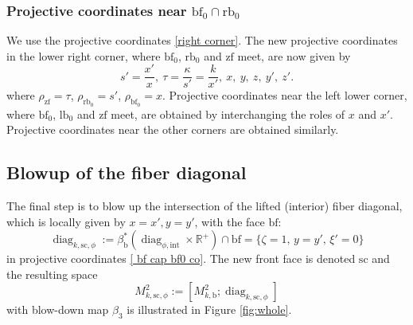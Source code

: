 \documentclass[11pt]{article}
\numberwithin{equation}{section}
\newcommand{\intt}{\mathrm{int}}
\theoremstyle{plain}
\theoremstyle{definition}
\newcommand{\R}{{\mathbb{R}}}
\newcommand{\bb}{{\mathrm{b}}}
\newcommand{\lfz}{{\mathrm{lb}_0}}
\newcommand{\rfz}{{\mathrm{rb}_0}}
\newcommand{\bbf}{{\mathrm{bf}}}
\newcommand{\bfz}{{\bbf_0}}
\newcommand{\ssc}{{\mathrm{sc}}}
\newcommand{\zf}{{\mathrm{zf}}}
\DeclareMathOperator\diag{diag}
\begin{document}
\subsubsection*{Projective coordinates near $\bfz \cap \rfz$}
We use the projective coordinates \eqref{right corner}. The new projective
coordinates in the lower right corner, where $\bfz$, $\rfz$ and $\zf$ meet, are now given by
\begin{equation}
s' = \frac{x'}{x}, \ \tau = \frac{\kappa}{s'} = \frac{k}{x'}, \ x, \ y, \ z, \ y', \ z'.
\end{equation}
where $\rho_{\zf} = \tau$, $\rho_{\rfz} = s'$, $\rho_{\bfz} = x$. Projective
coordinates near the left lower corner, where $\bfz$, $\lfz$ and $\zf$ meet,
are obtained by interchanging the roles of $x$ and $x'$. Projective coordinates near the other
corners are obtained similarly.

\subsection{Blowup of the fiber diagonal} \label{subsec:bup fiber diag}
The final step is to blow up the intersection of the lifted (interior) fiber diagonal, which is locally given by $x=x',y=y'$, with the face $\bbf$:
\begin{equation}
\label{eqn:def diag k sc phi}
\diag_{k,\ssc,\phi} := \beta_\bb^*(\diag_{\phi,\intt}\times\R^+) \cap \bbf = \{\zeta=1, \, y = y', \, \xi'=0\}
\end{equation}
in projective coordinates
\eqref{ bf cap bf0 co}.
The new front face is denoted $\ssc$ and the resulting space
\[
M^{2}_{k, \ssc,\phi}:= [M^{2}_{k,\bb} ; \diag_{k,\ssc,\phi}]
\]
with blow-down map $\beta_3$
is illustrated in Figure \ref{fig:whole}.
\end{document}
